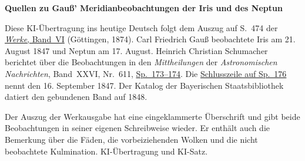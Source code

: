 \clearpage\thispagestyle{empty}
\begin{center}\textbf{Quellen zu Gauß’ Meridianbeobachtungen der Iris und des Neptun}\end{center}
\noindent Diese KI-Übertragung ins heutige Deutsch folgt dem Auszug auf S.~474 der \href{https://gdz.sub.uni-goettingen.de/id/PPN236007467}{\textit{Werke}, Band~VI} (Göttingen, 1874). Carl Friedrich Gauß beobachtete Iris am 21. August 1847 und Neptun am 17. August. Heinrich Christian Schumacher berichtet über die Beobachtungen in den \textit{Mittheilungen} der \textit{Astronomischen Nachrichten}, Band~XXVI, Nr.~611, \href{https://api.digitale-sammlungen.de/iiif/image/v2/bsb10049451_00095/full/1800,/0/default.jpg}{Sp.~173--174}. Die \href{https://api.digitale-sammlungen.de/iiif/image/v2/bsb10049451_00096/full/1800,/0/default.jpg}{Schlusszeile auf Sp.~176} nennt den 16. September 1847. Der Katalog der Bayerischen Staatsbibliothek datiert den gebundenen Band auf 1848.
\par\smallskip\noindent Der Auszug der Werkausgabe hat eine eingeklammerte Überschrift und gibt beide Beobachtungen in seiner eigenen Schreibweise wieder. Er enthält auch die Bemerkung über die Fäden, die vorbeiziehenden Wolken und die nicht beobachtete Kulmination. KI-Übertragung und KI-Satz.
\clearpage
